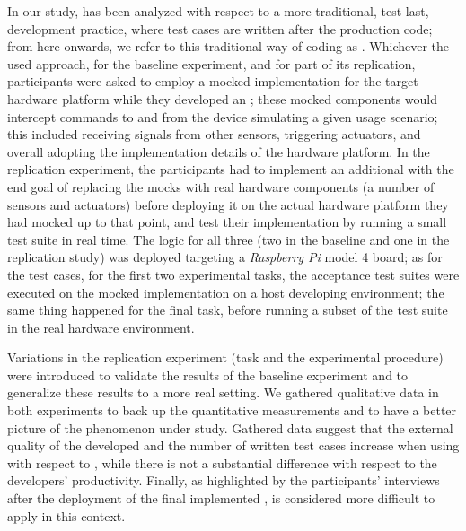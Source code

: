 In our study, \tdd has been analyzed with respect to a more traditional, test-last, development practice, where test cases are written after the production code; from here onwards, we refer to this traditional way of coding as \notdd. 
Whichever the used approach, for the baseline experiment, and for part of its replication, participants were asked to employ a mocked implementation for the target hardware platform while they developed an \es; these mocked components would intercept commands to and from the device simulating a given usage scenario; this included receiving signals from other sensors, triggering actuators, and overall adopting the implementation details of the hardware platform.
In the replication experiment, the participants had to implement an additional \es with the end goal of replacing the mocks with real hardware components (a number of sensors and actuators) before deploying it on the actual hardware platform they had mocked up to that point, and test their implementation by running a small test suite in real time. 
The logic for all three \ess (two in the baseline and one in the replication study) was deployed targeting a \textit{Raspberry Pi} model 4 board; as for the test cases, for the first two experimental tasks, the acceptance test suites were executed on the mocked implementation on a host developing environment; the same thing happened for the final task, before running a subset of the test suite in the real hardware environment. 

Variations in the replication experiment (task and the experimental procedure) were introduced to validate the results of the baseline experiment and to generalize these results to a more real setting. 
We gathered qualitative data in both experiments to back up the quantitative measurements and to have a better picture of the phenomenon under study. Gathered data suggest that the external quality of the developed \ess and the number of written test cases increase when using \tdd with respect to \notdd, while there is not a substantial difference with respect to the developers' productivity.
Finally, as highlighted by the participants' interviews after the deployment of the final implemented \es, \tdd is considered more difficult to apply in this context.

